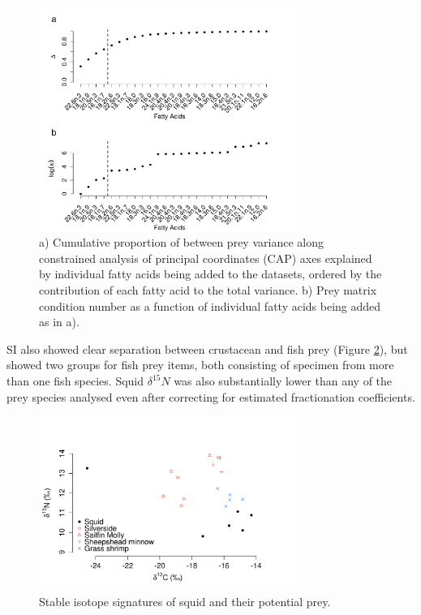 \documentclass[fleqn,10pt]{wlpeerj}
\begin{document}
\begin{figure}
  \begin{center}  
      \includegraphics[width=0.75\textwidth]{figures/var_select.pdf}
      \caption{a) Cumulative proportion of between prey variance along constrained analysis of principal coordinates (CAP) axes
      explained by individual fatty acids being added to the datasets,
      ordered by the contribution of each fatty acid to the total
      variance. b) Prey matrix condition number as a function of
      individual fatty acids being added as in a).}
    \label{fig:var_select}
  \end{center}
\end{figure}

SI also showed clear separation between crustacean and fish prey (Figure \ref{fig:squid_SI}),
but showed two groups for fish prey items, both consisting of specimen
from more than one fish species. Squid $\delta^{15}N$ was also substantially lower than any
of the prey species analysed even after correcting for estimated
fractionation coefficients.

\begin{figure}
  \begin{center}   
      \includegraphics[width=0.75\textwidth]{figures/SI_plot.pdf}
       \caption{Stable isotope signatures of squid and their potential prey.}
    \label{fig:squid_SI}
  \end{center}
\end{figure}
\end{document}
